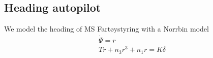 \subsection{Heading autopilot}\label{sec:prob1.1}
We model the heading of MS Fartøystyring with a Norrbin model
\begin{equation}
\begin{split}
\dot{\Psi} = r \\
T\dot{r}+n_3r^3 + n_1r=K\delta
\end{split}
\end{equation}
